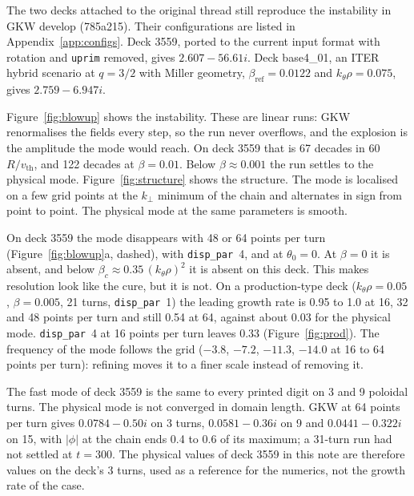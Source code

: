 \documentclass[10pt,a4paper]{article}
\makeatletter
\newcommand{\code}[1]{\texttt{#1}}
\renewcommand\paragraph{\@startsection{paragraph}{4}{\z@}{0.8em plus 0.2em}{-0.6em}{\sffamily\normalsize\bfseries}}
\makeatother
\begin{document}
The two decks attached to the original thread still reproduce the instability in GKW develop (785a215). Their configurations are listed in Appendix~\ref{app:configs}. Deck 3559, ported to the current input format with rotation and \code{uprim} removed, gives $2.607 - 56.61i$. Deck base4\_01, an ITER hybrid scenario at $q=3/2$ with Miller geometry, $\beta_{\mathrm{ref}}=0.0122$ and $k_\theta\rho=0.075$, gives $2.759 - 6.947i$.

Figure~\ref{fig:blowup} shows the instability. These are linear runs: GKW renormalises the fields every step, so the run never overflows, and the explosion is the amplitude the mode would reach. On deck 3559 that is 67 decades in 60~$R/v_{\mathrm{th}}$, and 122 decades at $\beta=0.01$. Below $\beta\approx0.001$ the run settles to the physical mode. Figure~\ref{fig:structure} shows the structure. The mode is localised on a few grid points at the $k_\perp$ minimum of the chain and alternates in sign from point to point. The physical mode at the same parameters is smooth.

On deck 3559 the mode disappears with 48 or 64 points per turn (Figure~\ref{fig:blowup}a, dashed), with \code{disp\_par}~4, and at $\theta_0=0$. At $\beta=0$ it is absent, and below $\beta_c\approx0.35\,(k_\theta\rho)^2$ it is absent on this deck. This makes resolution look like the cure, but it is not. On a production-type deck ($k_\theta\rho=0.05$, $\beta=0.005$, 21 turns, \code{disp\_par}~1) the leading growth rate is 0.95 to 1.0 at 16, 32 and 48 points per turn and still 0.54 at 64, against about 0.03 for the physical mode. \code{disp\_par}~4 at 16 points per turn leaves 0.33 (Figure~\ref{fig:prod}). The frequency of the mode follows the grid ($-3.8$, $-7.2$, $-11.3$, $-14.0$ at 16 to 64 points per turn): refining moves it to a finer scale instead of removing it.

\paragraph{Domain length.} The fast mode of deck 3559 is the same to every printed digit on 3 and 9 poloidal turns. The physical mode is not converged in domain length. GKW at 64 points per turn gives $0.0784-0.50i$ on 3 turns, $0.0581-0.36i$ on 9 and $0.0441-0.322i$ on 15, with $|\phi|$ at the chain ends 0.4 to 0.6 of its maximum; a 31-turn run had not settled at $t=300$. The physical values of deck 3559 in this note are therefore values on the deck's 3 turns, used as a reference for the numerics, not the growth rate of the case.
\end{document}
